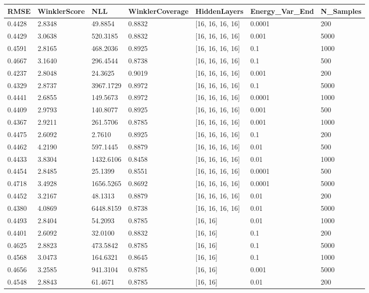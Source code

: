 \begin{tabular}{lllllll}
\toprule
RMSE & WinklerScore & NLL & WinklerCoverage & HiddenLayers & Energy_Var_End & N_Samples \\
\midrule
0.4428 & 2.8348 & 49.8854 & 0.8832 & [16, 16, 16, 16] & 0.0001 & 200 \\
0.4429 & 3.0638 & 520.3185 & 0.8832 & [16, 16, 16, 16] & 0.001 & 5000 \\
0.4591 & 2.8165 & 468.2036 & 0.8925 & [16, 16, 16, 16] & 0.1 & 1000 \\
0.4667 & 3.1640 & 296.4544 & 0.8738 & [16, 16, 16, 16] & 0.1 & 500 \\
0.4237 & 2.8048 & 24.3625 & 0.9019 & [16, 16, 16, 16] & 0.001 & 200 \\
0.4329 & 2.8737 & 3967.1729 & 0.8972 & [16, 16, 16, 16] & 0.1 & 5000 \\
0.4441 & 2.6855 & 149.5673 & 0.8972 & [16, 16, 16, 16] & 0.0001 & 1000 \\
0.4409 & 2.9793 & 140.8077 & 0.8925 & [16, 16, 16, 16] & 0.001 & 500 \\
0.4367 & 2.9211 & 261.5706 & 0.8785 & [16, 16, 16, 16] & 0.001 & 1000 \\
0.4475 & 2.6092 & 2.7610 & 0.8925 & [16, 16, 16, 16] & 0.1 & 200 \\
0.4462 & 4.2190 & 597.1445 & 0.8879 & [16, 16, 16, 16] & 0.01 & 500 \\
0.4433 & 3.8304 & 1432.6106 & 0.8458 & [16, 16, 16, 16] & 0.01 & 1000 \\
0.4454 & 2.8485 & 25.1399 & 0.8551 & [16, 16, 16, 16] & 0.0001 & 500 \\
0.4718 & 3.4928 & 1656.5265 & 0.8692 & [16, 16, 16, 16] & 0.0001 & 5000 \\
0.4452 & 3.2167 & 48.1313 & 0.8879 & [16, 16, 16, 16] & 0.01 & 200 \\
0.4380 & 4.0869 & 6448.8159 & 0.8738 & [16, 16, 16, 16] & 0.01 & 5000 \\
0.4493 & 2.8404 & 54.2093 & 0.8785 & [16, 16] & 0.01 & 1000 \\
0.4401 & 2.6092 & 32.0100 & 0.8832 & [16, 16] & 0.1 & 200 \\
0.4625 & 2.8823 & 473.5842 & 0.8785 & [16, 16] & 0.1 & 5000 \\
0.4568 & 3.0473 & 164.6321 & 0.8645 & [16, 16] & 0.1 & 1000 \\
0.4656 & 3.2585 & 941.3104 & 0.8785 & [16, 16] & 0.001 & 5000 \\
0.4548 & 2.8843 & 61.4671 & 0.8785 & [16, 16] & 0.01 & 200 \\

\end{tabular}
